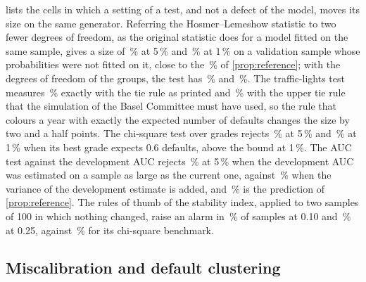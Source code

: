  lists the cells in which a setting of a test, and not a defect of the model, moves its size on the same generator.
Referring the Hosmer--Lemeshow statistic to two fewer degrees of freedom, as the original statistic does for a model fitted on the same sample, gives a size of \hlFitted\,\% at 5\,\% and \hlFittedOne\,\% at 1\,\% on a validation sample whose probabilities were not fitted on it, close to the \hlDofTheory\,\% of \cref{prop:reference}; with the degrees of freedom of the groups, the test has \hlFive\,\% and \hlOne\,\%.
The traffic-lights test measures \tlLowerExact\,\% exactly with the tie rule as printed and \tlUpperExact\,\% with the upper tie rule that the simulation of the Basel Committee must have used, so the rule that colours a year with exactly the expected number of defaults changes the size by two and a half points.
The chi-square test over grades rejects \chiThin\,\% at 5\,\% and \chiThinOne\,\% at 1\,\% when its best grade expects 0.6 defaults, above the bound at 1\,\%.
The AUC test against the development AUC rejects \aucDevOne\,\% at 5\,\% when the development AUC was estimated on a sample as large as the current one, against \aucDevOneExt\,\% when the variance of the development estimate is added, and \aucDevTheory\,\% is the prediction of \cref{prop:reference}.
The rules of thumb of the stability index, applied to two samples of 100 in which nothing changed, raise an alarm in \psiHundred\,\% of samples at 0.10 and \psiHundredTwentyFive\,\% at 0.25, against \psiHundredBench\,\% for its chi-square benchmark.



\subsection{Miscalibration and default clustering}
\label{sec:rs-defects}

